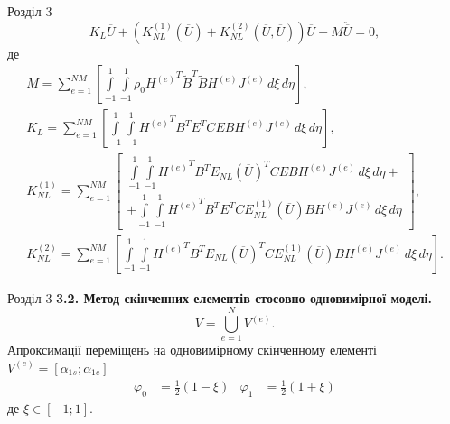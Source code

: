 \documentclass[8pt]{beamer}
\numberwithin{figure}{section}
\numberwithin{equation}{section}
\numberwithin{table}{section}
\begin{document}
\begin{frame}{Розділ 3}
\begin{equation}
K_L\overline{U}+\left( K_{NL}^{(1)}\left( \overline{U}\right)+K_{NL}^{(2)}\left( \overline{U},\overline{U}\right) \right)\overline{U}+M\ddot{\overline{U}}=0,
\end{equation}
де 
\begin{gather}
M=\sum_{e=1}^{NM}
\left[ \int\limits_{-1}^{1} \int\limits_{-1}^{1} \rho_0 {H^{(e)}}^T \tilde{B}^T \tilde{B} H^{(e)} J^{(e)} \, d\xi \, d\eta \right],\\
K_L=\sum_{e=1}^{NM}
\left[ \int\limits_{-1}^{1} \int\limits_{-1}^{1} {H^{(e)}}^T B^T E^T C E B H^{(e)} J^{(e)} \, d\xi \, d\eta \right],\\
K_{NL}^{(1)}=\sum_{e=1}^{NM}
\left[ 
\begin{aligned}
\int\limits_{-1}^{1} \int\limits_{-1}^{1} {H^{(e)}}^T B^T E_{NL}\left( \overline{U}\right)^T C E B H^{(e)} J^{(e)} \, d\xi \, d\eta + \\ 
+ \int\limits_{-1}^{1} \int\limits_{-1}^{1} {H^{(e)}}^T B^T E^T C E_{NL}^{(1)}\left( \overline{U}\right) B H^{(e)} J^{(e)} \, d\xi \, d\eta 
\end{aligned} 
\right],\\
K_{NL}^{(2)}=\sum_{e=1}^{NM}
\left[ 
\int\limits_{-1}^{1} \int\limits_{-1}^{1} {H^{(e)}}^T B^T E_{NL}\left( \overline{U}\right)^T C E_{NL}^{(1)}\left( \overline{U}\right) B H^{(e)} J^{(e)} \, d\xi \, d\eta 
\right].
\end{gather}

\end{frame}

\begin{frame}{Розділ 3}
\textbf{3.2. Метод скінченних елементів стосовно одновимірної моделі.}
\\
\vspace{1em}
\begin{equation}
V=\bigcup\limits_{e=1}^{N} V^{(e)}.
\end{equation}
Апроксимації переміщень на одновимірному скінченному елементі $V^{(e)} = [\alpha_{1s};\alpha_{1e}]$
\begin{equation}
\begin{aligned}
\varphi_0&=\frac{1}{2}\left(1-\xi\right) & \varphi_1 &=\frac{1}{2}\left(1+\xi\right)
\end{aligned}
\end{equation}
де $\xi \in [-1;1]$.
\end{frame}
\end{document}
